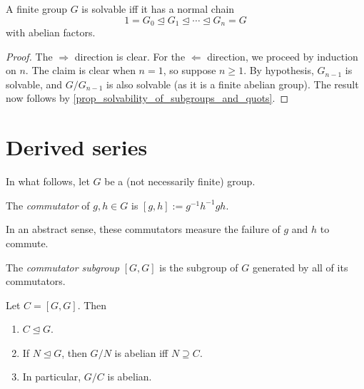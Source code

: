 \begin{corollary}
\label{cor_solvable_iff_ab_factors}
    A finite group $G$ is solvable iff it has a normal chain
    \[
        1 = G_0 \unlhd G_1 \unlhd \cdots \unlhd G_n = G
    \]
    with abelian factors.
\end{corollary}

\begin{proof}
    The $\Rightarrow$ direction is clear. For the $\Leftarrow$ direction, we proceed by induction on $n$. The claim is clear when $n = 1$, so suppose $n \geq 1$. By hypothesis, $G_{n - 1}$ is solvable, and $G/G_{n - 1}$ is also solvable (as it is a finite abelian group). The result now follows by \cref{prop_solvability_of_subgroups_and_quots}.
\end{proof}

\section{Derived series}

In what follows, let $G$ be a (not necessarily finite) group.

\begin{definition}
    The \emph{commutator} of $g, h \in G$ is $[g, h] := g^{-1}h^{-1}gh$.
\end{definition}

\begin{remark}
    In an abstract sense, these commutators measure the failure of $g$ and $h$ to commute.
\end{remark}

\begin{definition}
    The \emph{commutator subgroup} $[G, G]$ is the subgroup of $G$ generated by all of its commutators.
\end{definition}

\begin{lemma}
\label{lem_commutator_props}
    Let $C = [G, G]$. Then
    \begin{enumerate}[label=(\alph*)]
        \item $C \unlhd G$.
        \item If $N \unlhd G$, then $G/N$ is abelian iff $N \supseteq C$.
        \item In particular, $G/C$ is abelian.
    \end{enumerate}
\end{lemma}

